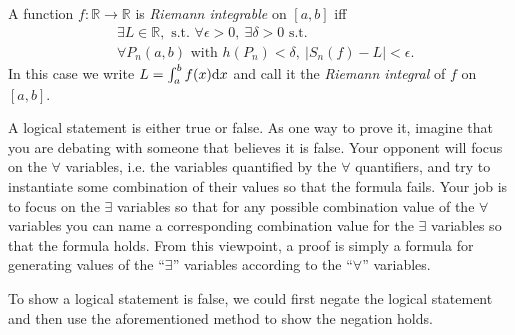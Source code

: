 \begin{defn}
  \label{def:RiemannIntegrable}
  A function $f: \mathbb{R}\rightarrow \mathbb{R}$
  is  %
  \emph{Riemann integrable} on  $[a, b]$
  iff %
  \begin{align}
    \nonumber
    &\exists L\in\mathbb{R}, \text{ s.t. }
      \forall \epsilon>0,\ \exists \delta>0 \text{ s.t. }
    \\ \label{eq:RiemannIntegrable}
    & \forall P_n(a,b) \text{ with } h(P_n)<\delta,\ 
      |S_n(f)-L|<\epsilon.
  \end{align}
  In this case we write $L=\int_a^b f(x) \mathrm{d} x$
  and call it the \emph{Riemann integral} of $f$ on $[a,b]$.
\end{defn}


\begin{rem}
  A logical statement is either true or false.
  As one way to prove it,
   imagine that you are debating with someone
   that believes it is false.
  Your opponent will focus on the $\forall$ variables,
   i.e. the variables quantified by the
   $\forall$ quantifiers, 
   and try to instantiate some combination of their values 
   so that the formula fails.
  Your job is to focus on the $\exists$ variables
   so that for any possible combination value of the $\forall$ variables
   you can name a corresponding combination value
   for the $\exists$ variables so that the formula holds.
  From this viewpoint, a proof is simply a formula
   for generating values of the ``$\exists$'' variables
   according to the ``$\forall$'' variables.

  To show a logical statement is false,
   we could first negate the logical statement
   and then use the aforementioned method to show the negation holds.
\end{rem}

